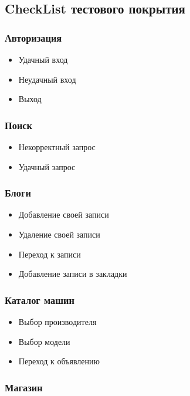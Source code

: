 \subsection{CheckList тестового покрытия}

\subsubsection{Авторизация}

\begin{itemize}
\item Удачный вход
\item Неудачный вход
\item Выход
\end{itemize}

\subsubsection{Поиск}

\begin{itemize}
\item Некорректный запрос
\item Удачный запрос
\end{itemize}

\subsubsection{Блоги}

\begin{itemize}
\item Добавление своей записи
\item Удаление своей записи
\item Переход к записи
\item Добавление записи в закладки
\end{itemize}

\subsubsection{Каталог машин}

\begin{itemize}
\item Выбор производителя
\item Выбор модели
\item Переход к объявлению
\end{itemize}

\subsubsection{Магазин}

